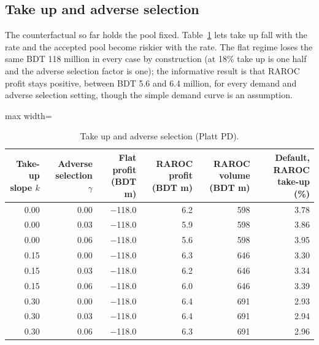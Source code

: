 \documentclass[11pt,a4paper]{article}
\newcommand{\tabsize}{\footnotesize}
\begin{document}
\subsection{Take up and adverse selection}
The counterfactual so far holds the pool fixed. Table~\ref{tab:take} lets take up fall with the rate and the accepted pool become riskier with the rate. The flat regime loses the same BDT 118 million in every case by construction (at 18\% take up is one half and the adverse selection factor is one); the informative result is that RAROC profit stays positive, between BDT 5.6 and 6.4 million, for every demand and adverse selection setting, though the simple demand curve is an assumption.
\begin{table}[H]\centering\tabsize\caption{Take up and adverse selection (Platt PD).}\label{tab:take}
\begin{adjustbox}{max width=\textwidth}
\begin{tabular}{rrrrrr}
\toprule
Take-up slope $k$ & Adverse selection $\gamma$ & Flat profit (BDT m) & RAROC profit (BDT m) & RAROC volume (BDT m) & Default, RAROC take-up (\%) \\
\midrule
0.00 & 0.00 & $-$118.0 & 6.2 & 598 & 3.78 \\
0.00 & 0.03 & $-$118.0 & 5.9 & 598 & 3.86 \\
0.00 & 0.06 & $-$118.0 & 5.6 & 598 & 3.95 \\
0.15 & 0.00 & $-$118.0 & 6.3 & 646 & 3.30 \\
0.15 & 0.03 & $-$118.0 & 6.2 & 646 & 3.34 \\
0.15 & 0.06 & $-$118.0 & 6.0 & 646 & 3.39 \\
0.30 & 0.00 & $-$118.0 & 6.4 & 691 & 2.93 \\
0.30 & 0.03 & $-$118.0 & 6.4 & 691 & 2.94 \\
0.30 & 0.06 & $-$118.0 & 6.3 & 691 & 2.96 \\
\bottomrule
\end{tabular}
\end{adjustbox}\end{table}
\end{document}
